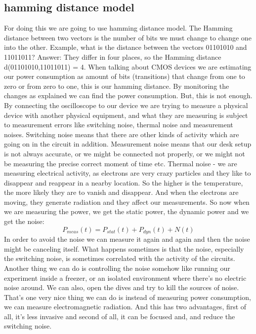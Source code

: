 \subsection { hamming distance model }
For doing this we are going to use hamming distance model. The Hamming distance between two vectors is the number of bits we must change to change one into the other. Example, what is the distance between the vectors 01101010 and 11011011? 
Answer: They differ in four places, so the Hamming distance d(01101010,11011011) = 4.
When talking about CMOS devices we are estimating our power consumption as amount of bits (transitions) that change from one to zero or from zero to one, this is our hamming distance. By monitoring the changes as explained we can find the power consumption.
But, this is not enough. By connecting the oscilloscope to our device we are trying to measure a physical device with another physical equipment, and what they are measuring is subject to measurement errors like switching noise, thermal noise and measurement noises.
Switching noise means that there are other kinds of activity which are going on in the circuit in addition. Measurement noise means that our desk setup is not always accurate, or we might be connected not properly, or we might not be measuring the precise correct moment of time etc. Thermal noise - we are measuring electrical activity, as electrons are very crazy particles and they like to disappear and reappear in a nearby location. So the higher is the temperature, the more likely they are to vanish and disappear. And when the electrons are moving, they generate radiation and they affect our measurements.
So now when we are measuring the power, we get the static power, the dynamic power and we get the noise:
\begin{displaymath}
    P_{meas}(t)=P_{stat}(t) + P_{dyn}(t) + N(t)
\end{displaymath}
In order to avoid the noise we can measure it again and again and then the noise might be canceling itself. What happens sometimes is that the noise, especially the switching noise, is sometimes correlated with the activity of the circuits. Another thing we can do is controlling the noise somehow like running our experiment inside a freezer, or an isolated environment where there's no electric noise around. We can also, open the dives and try to kill the sources of noise.
That's one very nice thing we can do is instead of measuring power consumption, we can measure electromagnetic radiation. And this has two advantages, first of all, it's less invasive and second of all, it can be focused and, and reduce the switching noise.
